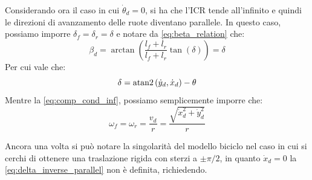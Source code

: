 Considerando ora il caso in cui $\dot{\theta}_d = 0$, si ha che l'ICR tende all'infinito e quindi le direzioni di avanzamento delle ruote diventano parallele. In questo caso, possiamo imporre $\delta_f = \delta_r = \delta$ e notare da \cref{eq:beta_relation} che:
\begin{equation}\label{eq:delta_parallel}
    \beta_d = \arctan\left(\frac{l_f+l_r}{l_f+l_r}\tan(\delta)\right) = \delta
\end{equation}
Per cui vale che:
\begin{equation}\label{eq:delta_inverse_parallel}
    \delta = \operatorname{atan2}\left(\dot{y}_d,\dot{x}_d\right) - \theta
\end{equation}
Mentre la \cref{eq:comp_cond_inf}, possiamo semplicemente imporre che:
\begin{equation}\label{eq:omegaf_inverse_parallel}
    \omega_f = \omega_r = \frac{v_d}{r} = \frac{\sqrt{\dot{x}_d^2 + \dot{y}_d^2}}{r}
\end{equation}
\begin{note}
    Ancora una volta si può notare la singolarità del modello biciclo nel caso in cui si cerchi di ottenere una traslazione rigida con sterzi a $\pm \pi/2$, in quanto $\dot{x}_d = 0$ la \cref{eq:delta_inverse_parallel} non è definita, richiedendo.
\end{note}

